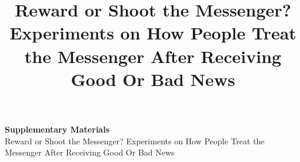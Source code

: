 \documentclass[12pt,letterpaper]{article}
\title{Reward or Shoot the Messenger? Experiments on How People Treat the Messenger After Receiving Good Or Bad News}
\date{}
\newcommand{\tit}{Reward or Shoot the Messenger? Experiments on How People Treat the Messenger After Receiving Good Or Bad News}
\begin{document}


\clearpage





\clearpage{}

%



\clearpage
\appendix
\thispagestyle{empty}

\doparttoc %
\faketableofcontents %

\begin{center}
{\bf \LARGE Supplementary Materials} \\
\vspace{0.2in}
{\doublespacing\Large \tit}
\end{center}

\part{} %
\parttoc %

\clearpage
\renewcommand{\thepage}{A\arabic{page}}
\setcounter{section}{0}
\setcounter{page}{1}
\setcounter{table}{0}
\setcounter{footnote}{0}
\renewcommand{\thetable}{\Alph{section}\arabic{table}}
\renewcommand{\thefigure}{\Alph{section}\arabic{figure}}
\renewcommand{\baselinestretch}{1.25}
\setlength{\footnotesep}{1.25 \footnotesep}



\end{document}
